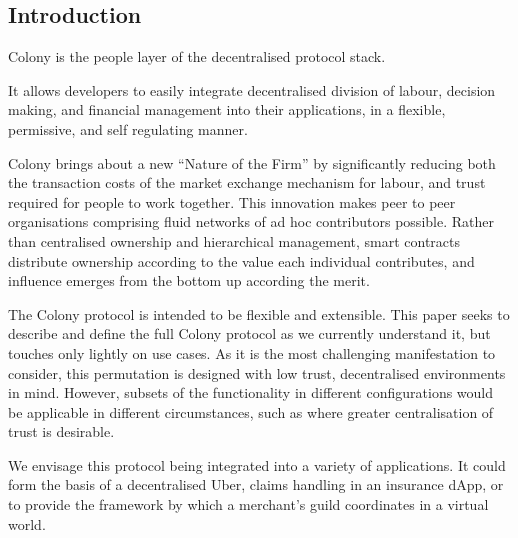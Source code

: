 \subsection*{Introduction}

Colony is the people layer of the decentralised protocol stack.

It allows developers to easily integrate decentralised division of labour, decision making, and financial management into their applications, in a flexible, permissive, and self regulating manner.

Colony brings about a new “Nature of the Firm” \cite{The-Nature-of-the-Firm} by significantly reducing both the transaction costs of the market exchange mechanism for labour, and trust required for people to work together. This innovation makes peer to peer organisations comprising fluid networks of ad hoc contributors possible. Rather than centralised ownership and hierarchical management, smart contracts distribute ownership according to the value each individual contributes, and influence emerges from the bottom up according the merit.

The Colony protocol is intended to be flexible and extensible. This paper seeks to describe and define the full Colony protocol as we currently understand it, but touches only lightly on use cases. As it is the most challenging manifestation to consider, this permutation is designed with low trust, decentralised environments in mind. However, subsets of the functionality in different configurations would be applicable in different circumstances, such as where greater centralisation of trust is desirable.

We envisage this protocol being integrated into a variety of applications. It could form the basis of a decentralised Uber, claims handling in an insurance dApp, or to provide the framework by which a merchant’s guild coordinates in a virtual world.







